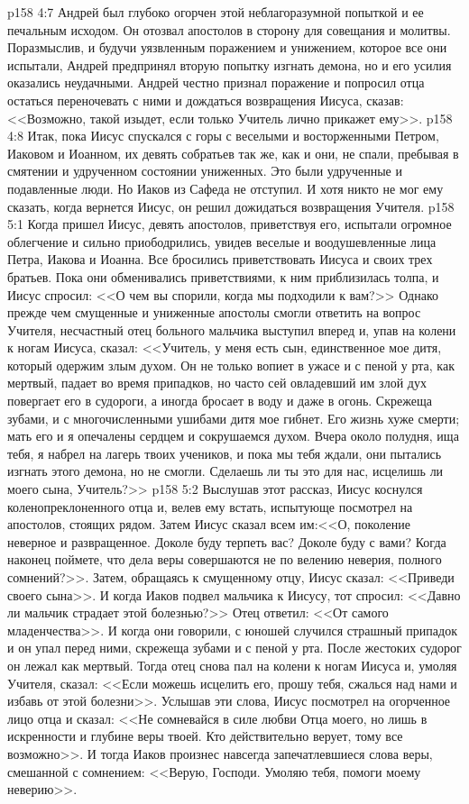 \vs p158 4:7 Андрей был глубоко огорчен этой неблагоразумной попыткой и ее печальным исходом. Он отозвал апостолов в сторону для совещания и молитвы. Поразмыслив, и будучи уязвленным поражением и унижением, которое все они испытали, Андрей предпринял вторую попытку изгнать демона, но и его усилия оказались неудачными. Андрей честно признал поражение и попросил отца остаться переночевать с ними и дождаться возвращения Иисуса, сказав: <<Возможно, такой изыдет, если только Учитель лично прикажет ему>>.
\vs p158 4:8 Итак, пока Иисус спускался с горы с веселыми и восторженными Петром, Иаковом и Иоанном, их девять собратьев так же, как и они, не спали, пребывая в смятении и удрученном состоянии униженных. Это были удрученные и подавленные люди. Но Иаков из Сафеда не отступил. И хотя никто не мог ему сказать, когда вернется Иисус, он решил дожидаться возвращения Учителя.
\vs p158 5:1 Когда пришел Иисус, девять апостолов, приветствуя его, испытали огромное облегчение и сильно приободрились, увидев веселые и воодушевленные лица Петра, Иакова и Иоанна. Все бросились приветствовать Иисуса и своих трех братьев. Пока они обменивались приветствиями, к ним приблизилась толпа, и Иисус спросил: <<О чем вы спорили, когда мы подходили к вам?>> Однако прежде чем смущенные и униженные апостолы смогли ответить на вопрос Учителя, несчастный отец больного мальчика выступил вперед и, упав на колени к ногам Иисуса, сказал: <<Учитель, у меня есть сын, единственное мое дитя, который одержим злым духом. Он не только вопиет в ужасе и с пеной у рта, как мертвый, падает во время припадков, но часто сей овладевший им злой дух повергает его в судороги, а иногда бросает в воду и даже в огонь. Скрежеща зубами, и с многочисленными ушибами дитя мое гибнет. Его жизнь хуже смерти; мать его и я опечалены сердцем и сокрушаемся духом. Вчера около полудня, ища тебя, я набрел на лагерь твоих учеников, и пока мы тебя ждали, они пытались изгнать этого демона, но не смогли. Сделаешь ли ты это для нас, исцелишь ли моего сына, Учитель?>>
\vs p158 5:2 Выслушав этот рассказ, Иисус коснулся коленопреклоненного отца и, велев ему встать, испытующе посмотрел на апостолов, стоящих рядом. Затем Иисус сказал всем им:<<О, поколение неверное и развращенное. Доколе буду терпеть вас? Доколе буду с вами? Когда наконец поймете, что дела веры совершаются не по велению неверия, полного сомнений?>>. Затем, обращаясь к смущенному отцу, Иисус сказал: <<Приведи своего сына>>. И когда Иаков подвел мальчика к Иисусу, тот спросил: <<Давно ли мальчик страдает этой болезнью?>> Отец ответил: <<От самого младенчества>>. И когда они говорили, с юношей случился страшный припадок и он упал перед ними, скрежеща зубами и с пеной у рта. После жестоких судорог он лежал как мертвый. Тогда отец снова пал на колени к ногам Иисуса и, умоляя Учителя, сказал: <<Если можешь исцелить его, прошу тебя, сжалься над нами и избавь от этой болезни>>. Услышав эти слова, Иисус посмотрел на огорченное лицо отца и сказал: <<Не сомневайся в силе любви Отца моего, но лишь в искренности и глубине веры твоей. Кто действительно верует, тому все возможно>>. И тогда Иаков произнес навсегда запечатлевшиеся слова веры, смешанной с сомнением: <<Верую, Господи. Умоляю тебя, помоги моему неверию>>.
